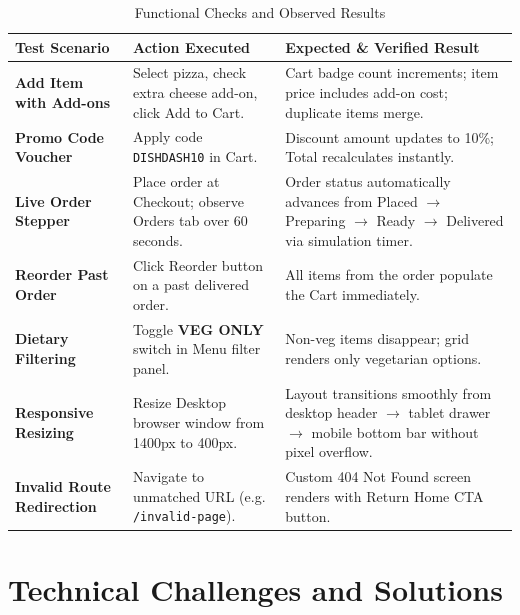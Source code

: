 \documentclass[11pt,a4paper]{article}
\begin{document}
\begin{table}[htbp]
\caption{Functional Checks and Observed Results}
\label{tab:testing_matrix}
\centering
\small
\begin{tabularx}{\linewidth}{@{}lYY@{}}
\toprule
\textbf{Test Scenario} & \textbf{Action Executed} & \textbf{Expected \& Verified Result} \\
\midrule
\textbf{Add Item with Add-ons} & Select pizza, check extra cheese add-on, click Add to Cart. & Cart badge count increments; item price includes add-on cost; duplicate items merge. \\
\addlinespace
\textbf{Promo Code Voucher} & Apply code \texttt{DISHDASH10} in Cart. & Discount amount updates to 10\%; Total recalculates instantly. \\
\addlinespace
\textbf{Live Order Stepper} & Place order at Checkout; observe Orders tab over 60 seconds. & Order status automatically advances from Placed $\rightarrow$ Preparing $\rightarrow$ Ready $\rightarrow$ Delivered via simulation timer. \\
\addlinespace
\textbf{Reorder Past Order} & Click Reorder button on a past delivered order. & All items from the order populate the Cart immediately. \\
\addlinespace
\textbf{Dietary Filtering} & Toggle \textbf{VEG ONLY} switch in Menu filter panel. & Non-veg items disappear; grid renders only vegetarian options. \\
\addlinespace
\textbf{Responsive Resizing} & Resize Desktop browser window from 1400px to 400px. & Layout transitions smoothly from desktop header $\rightarrow$ tablet drawer $\rightarrow$ mobile bottom bar without pixel overflow. \\
\addlinespace
\textbf{Invalid Route Redirection} & Navigate to unmatched URL (e.g. \texttt{/invalid-page}). & Custom 404 Not Found screen renders with Return Home CTA button. \\
\bottomrule
\end{tabularx}
\end{table}

\FloatBarrier

\section{Technical Challenges and Solutions}
\end{document}
